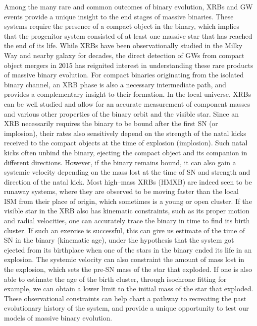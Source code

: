 \documentclass[linenumbers,trackchanges,twocolumn]{aastex701}
\begin{document}
Among the many rare and common outcomes of binary evolution, XRBs and GW events provide a unique insight to the end stages of massive binaries. These systems require the presence of a compact object in the binary, which implies that the progenitor system consisted of at least one massive star that has reached the end of its life. While XRBs have been observationally studied in the Milky Way and nearby galaxy for decades, the direct detection of GWs from compact object mergers in 2015 has reignited interest in understanding these rare products of massive binary evolution. For compact binaries originating from the isolated binary channel, an XRB phase is also a necessary intermediate path, and provides a complementary insight to their formation. In the local universe, XRBs can be well studied and allow for an accurate measurement of component masses and various other properties of the binary orbit and the visible star. Since an XRB necessarily requires the binary to be bound after the first SN (or implosion), their rates also sensitively depend on the strength of the natal kicks received to the compact objects at the time of explosion (implosion). Such natal kicks often unbind the binary, ejecting the compact object and its companion in different directions. However, if the binary remains bound, it can also gain a systemic velocity depending on the mass lost at the time of SN and strength and direction of the natal kick. Most high--mass XRBs (HMXB) are indeed seen to be runaway systems, where they are observed to be moving faster than the local ISM from their place of origin, which sometimes is a young or open cluster. If the visible star in the XRB also has kinematic constraints, such as its proper motion and radial velocities, one can accurately trace the binary in time to find its birth cluster. If such an exercise is successful, this can give us estimate of the time of SN in the binary (kinematic age), under the hypothesis that the system got ejected from its birthplace when one of the stars in the binary ended its life in an explosion. The systemic velocity can also constraint the amount of mass lost in the explosion, which sets the pre-SN mass of the star that exploded. If one is also able to estimate the age of the birth cluster, through isochrone fitting for example, we can obtain a lower limit to the initial mass of the star that exploded. These observational constraints can help chart a pathway to recreating the past evolutionary history of the system, and provide a unique opportunity to test our models of massive binary evolution.
\end{document}

